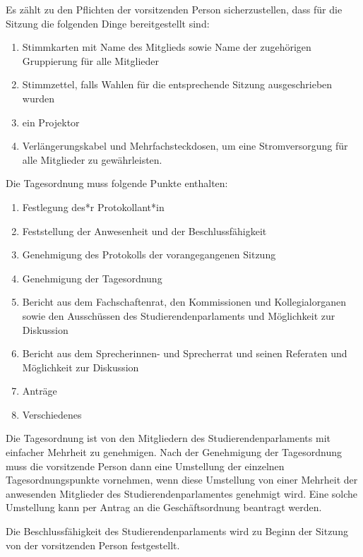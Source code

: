 \documentclass[10pt,a4paper]{scrartcl}
\providecommand{\tightlist}{%
\setlength{\itemsep}{0pt}\setlength{\parskip}{0pt}}
\begin{document}
\begin{contract}
  Es zählt zu den Pflichten der vorsitzenden Person sicherzustellen,
  dass für die Sitzung die folgenden Dinge bereitgestellt sind:

\begin{enumerate}
\item
  Stimmkarten mit Name des Mitglieds sowie Name der zugehörigen
  Gruppierung für alle Mitglieder
\item
  Stimmzettel, falls Wahlen für die entsprechende Sitzung ausgeschrieben
  wurden
\item
  ein Projektor
\item
  Verlängerungskabel und Mehrfachsteckdosen, um eine Stromversorgung für
  alle Mitglieder zu gewährleisten.
\end{enumerate}


\label{tagesordnung}

  Die Tagesordnung muss folgende Punkte enthalten:
\begin{enumerate}[label=\alph*]
	\tightlist
\item Festlegung des*r
  Protokollant*in
\item Feststellung der Anwesenheit und der
  Beschlussfähigkeit
\item Genehmigung des Protokolls der vorangegangenen
  Sitzung
\item Genehmigung der Tagesordnung
\item Bericht aus dem
  Fachschaftenrat, den Kommissionen und Kollegialorganen sowie den
  Ausschüssen des Studierendenparlaments und Möglichkeit zur Diskussion
\item Bericht aus dem Sprecherinnen- und Sprecherrat und seinen Referaten
  und Möglichkeit zur Diskussion
\item Anträge
\item Verschiedenes
	\end{enumerate}

  Die Tagesordnung ist von den Mitgliedern des Studierendenparlaments
  mit einfacher Mehrheit zu genehmigen. Nach der Genehmigung der
  Tagesordnung muss die vorsitzende Person dann eine Umstellung der
  einzelnen Tagesordnungspunkte vornehmen, wenn diese Umstellung von
  einer Mehrheit der anwesenden Mitglieder des Studierendenparlamentes
  genehmigt wird. Eine solche Umstellung kann per Antrag an die
  Geschäftsordnung beantragt werden.


\label{beschlussfuxe4higkeit}



  Die Beschlussfähigkeit des Studierendenparlaments wird zu Beginn der
  Sitzung von der vorsitzenden Person festgestellt.


\end{contract}
\end{document}

